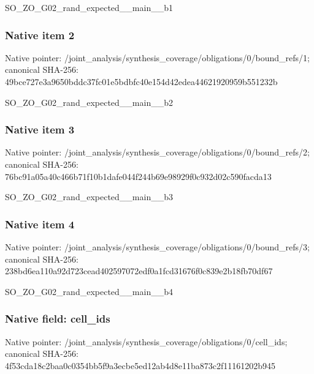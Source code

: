 \documentclass[10pt,a4paper]{article}
\begin{document}
\begingroup\raggedright\sloppy SO\_\allowbreak{}ZO\_\allowbreak{}G02\_\allowbreak{}rand\_\allowbreak{}expected\_\allowbreak{}\_\allowbreak{}main\_\allowbreak{}\_\allowbreak{}b1\par\endgroup

\subsubsection{Native item 2}
Native pointer: /joint\_\allowbreak{}analysis/synthesis\_\allowbreak{}coverage/obligations/0/bound\_\allowbreak{}refs/1; canonical SHA-256: 49bce727e3a9650bddc37fc01e5bdbfc40e154d42edea44621920959b551232b

\begingroup\raggedright\sloppy SO\_\allowbreak{}ZO\_\allowbreak{}G02\_\allowbreak{}rand\_\allowbreak{}expected\_\allowbreak{}\_\allowbreak{}main\_\allowbreak{}\_\allowbreak{}b2\par\endgroup

\subsubsection{Native item 3}
Native pointer: /joint\_\allowbreak{}analysis/synthesis\_\allowbreak{}coverage/obligations/0/bound\_\allowbreak{}refs/2; canonical SHA-256: 76bc91a05a40c466b71f10b1dafe044f244b69e98929f0c932d02c590facda13

\begingroup\raggedright\sloppy SO\_\allowbreak{}ZO\_\allowbreak{}G02\_\allowbreak{}rand\_\allowbreak{}expected\_\allowbreak{}\_\allowbreak{}main\_\allowbreak{}\_\allowbreak{}b3\par\endgroup

\subsubsection{Native item 4}
Native pointer: /joint\_\allowbreak{}analysis/synthesis\_\allowbreak{}coverage/obligations/0/bound\_\allowbreak{}refs/3; canonical SHA-256: 238bd6ea110a92d723cead402597072edf0a1fcd31676f0c839e2b18fb70df67

\begingroup\raggedright\sloppy SO\_\allowbreak{}ZO\_\allowbreak{}G02\_\allowbreak{}rand\_\allowbreak{}expected\_\allowbreak{}\_\allowbreak{}main\_\allowbreak{}\_\allowbreak{}b4\par\endgroup

\subsubsection{Native field: cell\_\allowbreak{}ids}
Native pointer: /joint\_\allowbreak{}analysis/synthesis\_\allowbreak{}coverage/obligations/0/cell\_\allowbreak{}ids; canonical SHA-256: 4f53cda18c2baa0c0354bb5f9a3ecbe5ed12ab4d8e11ba873c2f11161202b945
\end{document}
